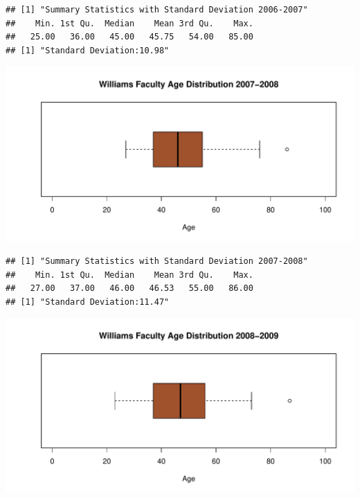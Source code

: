 \documentclass[12pt,a4paper]{article}\usepackage[]{graphicx}\usepackage[]{color}
\makeatletter
\def\maxwidth{ %
  \ifdim\Gin@nat@width>\linewidth
    \linewidth
  \else
    \Gin@nat@width
  \fi
}
\newenvironment{kframe}{%
 \def\at@end@of@kframe{}%
 \ifinner\ifhmode%
  \def\at@end@of@kframe{\end{minipage}}%
  \begin{minipage}{\columnwidth}%
 \fi\fi%
 \def\FrameCommand##1{\hskip\@totalleftmargin \hskip-\fboxsep
 \colorbox{shadecolor}{##1}\hskip-\fboxsep
     \hskip-\linewidth \hskip-\@totalleftmargin \hskip\columnwidth}%
 \MakeFramed {\advance\hsize-\width
   \@totalleftmargin\z@ \linewidth\hsize
   \@setminipage}}%
 {\par\unskip\endMakeFramed%
 \at@end@of@kframe}
\newenvironment{knitrout}{}{} %
\theoremstyle{definition}
\makeatother
\begin{document}
\begin{knitrout}
\color{fgcolor}\begin{kframe}
\begin{verbatim}
## [1] "Summary Statistics with Standard Deviation 2006-2007"
##    Min. 1st Qu.  Median    Mean 3rd Qu.    Max. 
##   25.00   36.00   45.00   45.75   54.00   85.00
## [1] "Standard Deviation:10.98"
\end{verbatim}
\end{kframe}
\end{knitrout}

\begin{knitrout}
\color{fgcolor}
\includegraphics[width=\maxwidth]{figure/unnamed-chunk-19-1} 

\end{knitrout}

\begin{knitrout}
\color{fgcolor}\begin{kframe}
\begin{verbatim}
## [1] "Summary Statistics with Standard Deviation 2007-2008"
##    Min. 1st Qu.  Median    Mean 3rd Qu.    Max. 
##   27.00   37.00   46.00   46.53   55.00   86.00
## [1] "Standard Deviation:11.47"
\end{verbatim}
\end{kframe}
\end{knitrout}


\begin{knitrout}
\color{fgcolor}
\includegraphics[width=\maxwidth]{figure/unnamed-chunk-21-1} 

\end{knitrout}
\end{document}
